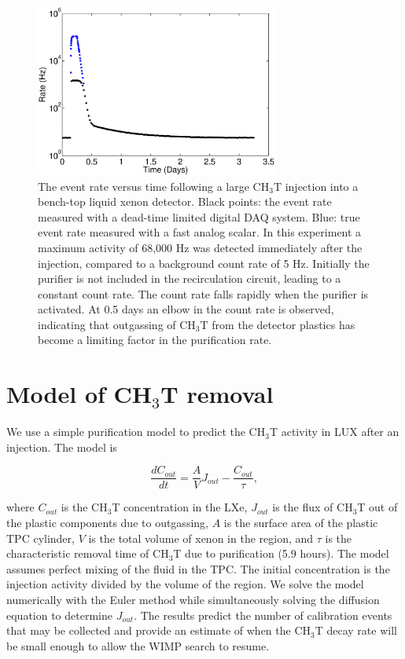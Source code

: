 \begin{figure}[h!]\centering
\includegraphics[width=80mm]{fig/TimeHisto_Analog2.eps}
\caption{The event rate versus time following a large CH$_3$T injection into a bench-top liquid xenon detector. Black points: the event rate measured with a dead-time limited digital DAQ system. Blue: true event rate measured with a fast analog scalar. In this experiment a maximum activity of 68,000 Hz was detected immediately after the injection, compared to a background count rate of 5 Hz. Initially the purifier is not included in the recirculation circuit, leading to a constant count rate. The count rate falls rapidly when the purifier is activated. At 0.5 days an elbow in the count rate is observed, indicating that outgassing of CH$_3$T from the detector plastics has become a limiting factor in the purification rate. }
\label{fig:Density}
\end{figure}


\section{Model of CH$_3$T removal}
\label{sec:appendix2}

We use a simple purification model to predict the CH$_3$T activity in LUX after an injection. The model is 

\begin{equation}
\frac{d C_{out}}{dt} = \frac{A}{V}J_{out} -\frac{C_{out}}{\tau},
\end{equation}

\noindent where  $C_{out}$ is the CH$_3$T concentration in the LXe,  $J_{out}$ is the flux of CH$_3$T out of the plastic components due to outgassing,  $A$ is the surface area of the plastic TPC cylinder, $V$ is the total volume of xenon in the  region, and $\tau$ is the characteristic removal time of CH$_3$T due to purification (5.9 hours). The model assumes perfect mixing of the fluid in the TPC. The initial concentration is the injection activity divided by the volume of the  region. We solve the model numerically with the Euler method while simultaneously solving the diffusion equation to determine $J_{out}$. The results predict the number of calibration events that may be collected and provide an estimate of when the CH$_3$T  decay rate will be small enough to allow the WIMP search to resume.

